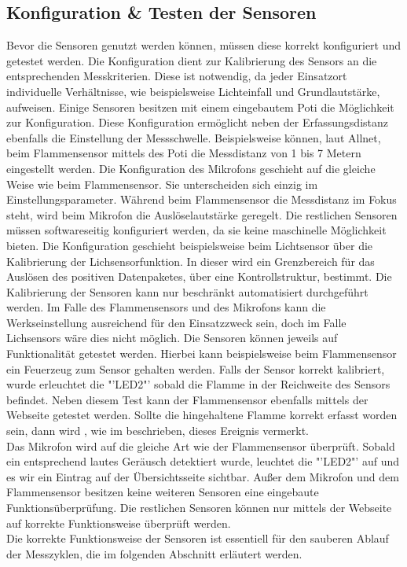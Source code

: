 \subsection{Konfiguration \& Testen der Sensoren}
	Bevor die Sensoren genutzt werden können, müssen diese korrekt konfiguriert und getestet werden. Die Konfiguration dient zur Kalibrierung des Sensors an die entsprechenden Messkriterien. Diese ist notwendig, da jeder Einsatzort individuelle Verhältnisse, wie beispielsweise Lichteinfall und Grundlautstärke, aufweisen. Einige Sensoren besitzen mit einem eingebautem \ac{Poti} die Möglichkeit zur Konfiguration. Diese Konfiguration ermöglicht neben der Erfassungsdistanz ebenfalls die Einstellung der Messschwelle. Beispielsweise können, laut Allnet\cite{111861pd90:online}, beim Flammensensor mittels des \ac{Poti} die Messdistanz von 1 bis 7 Metern eingestellt werden. Die Konfiguration des Mikrofons geschieht auf die gleiche Weise wie beim Flammensensor. Sie unterscheiden sich einzig im Einstellungsparameter. Während beim Flammensensor die Messdistanz im Fokus steht, wird beim Mikrofon die Auslöselautstärke geregelt. Die restlichen Sensoren müssen softwareseitig konfiguriert werden, da sie keine maschinelle Möglichkeit bieten. Die Konfiguration geschieht beispielsweise beim Lichtsensor über die Kalibrierung der Lichsensorfunktion. In dieser wird ein Grenzbereich für das Auslösen des positiven Datenpaketes, über eine Kontrollstruktur, bestimmt. Die Kalibrierung der Sensoren kann nur beschränkt automatisiert durchgeführt werden. Im Falle des Flammensensors und des Mikrofons kann die Werkseinstellung ausreichend für den Einsatzzweck sein, doch im Falle Lichsensors wäre dies nicht möglich. Die Sensoren können jeweils auf Funktionalität getestet werden. Hierbei kann beispielsweise beim Flammensensor ein Feuerzeug zum Sensor gehalten werden. Falls der Sensor korrekt kalibriert, wurde erleuchtet die "'LED2"' sobald die Flamme in der Reichweite des Sensors befindet. Neben diesem Test kann der Flammensensor ebenfalls mittels der Webseite getestet werden. Sollte die hingehaltene Flamme korrekt erfasst worden sein, dann wird , wie im  beschrieben, dieses Ereignis vermerkt.\\
	Das Mikrofon wird auf die gleiche Art wie der Flammensensor überprüft. Sobald ein entsprechend lautes Geräusch detektiert wurde, leuchtet die "'LED2"' auf und es wir ein Eintrag auf der Übersichtsseite sichtbar. Außer dem Mikrofon und dem Flammensensor besitzen keine weiteren Sensoren eine eingebaute Funktionsüberprüfung. Die restlichen Sensoren können nur mittels der Webseite auf korrekte Funktionsweise überprüft werden.\\
	Die korrekte Funktionsweise der Sensoren ist essentiell für den sauberen Ablauf der Messzyklen, die im folgenden Abschnitt erläutert werden.

